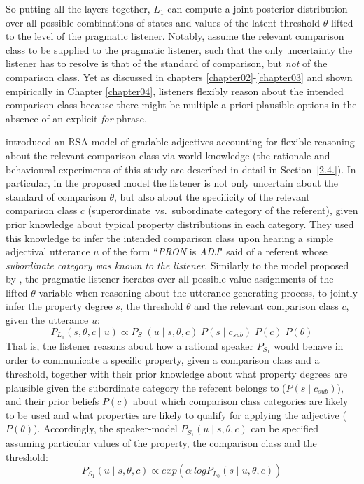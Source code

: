 So putting all the layers together, $L_1$ can compute a joint posterior distribution over all possible combinations of states and values of the latent threshold $\theta$ lifted to the level of the pragmatic listener. Notably, \textcite{lassiter2013context} assume the relevant comparison class to be supplied to the pragmatic listener, such that the only uncertainty the listener has to resolve is that of the standard of comparison, but \emph{not} of the comparison class. Yet as discussed in chapters \ref{chapter02}-\ref{chapter03} and shown empirically in Chapter \ref{chapter04}, listeners flexibly reason about the intended comparison class because there might be multiple a priori plausible options in the absence of an explicit \emph{for}-phrase.

\textcite{tessler2017warm} introduced an RSA-model of gradable adjectives accounting for flexible reasoning about the relevant comparison class via world knowledge (the rationale and behavioural experiments of this study are described in detail in Section~\ref{2.4.}). In particular, in the proposed model the listener is not only uncertain about the standard of comparison $\theta$, but also about the specificity of the relevant comparison class $c$ (superordinate~vs.~subordinate category of the referent), given prior knowledge about typical property distributions in each category. %
They used this knowledge to infer the intended comparison class upon hearing a simple adjectival utterance $u$ of the form ``\emph{PRON} is \emph{ADJ}" said of a referent whose \emph{subordinate category was known to the listener}.
Similarly to the model proposed by \textcite{lassiter2013context}, the pragmatic listener iterates over all possible value assignments of the lifted $\theta$ variable when reasoning about the utterance-generating process, to jointly infer the property degree $s$, the threshold $\theta$ and the relevant comparison class $c$, given the utterance $u$:
\begin{equation}
P_{L_1}(s, \theta, c \mid u) \propto P_{S_1} ( u \mid s, \theta, c) \; P(s \mid c_{sub}) \; P(c) \; P(\theta)
\end{equation} 
That is, the listener reasons about how a rational speaker $P_{S_1}$ would behave in order to communicate a specific property, given a comparison class and a threshold, together with their prior knowledge about what property degrees are plausible given the subordinate category the referent belongs to ($P(s \mid c _{sub})$), and their prior beliefs $P(c)$ about which comparison class categories are likely to be used and what properties are likely to qualify for applying the adjective ($P(\theta)$). Accordingly, the speaker-model $P_{S_1}( u \mid s, \theta, c)$ can be specified assuming particular values of the property, the comparison class and the threshold:
\begin{equation}
P_{S_1}( u \mid s, \theta, c) \propto exp(\alpha \: log P_{L_0} (s \mid u, \theta, c))
\end{equation}

